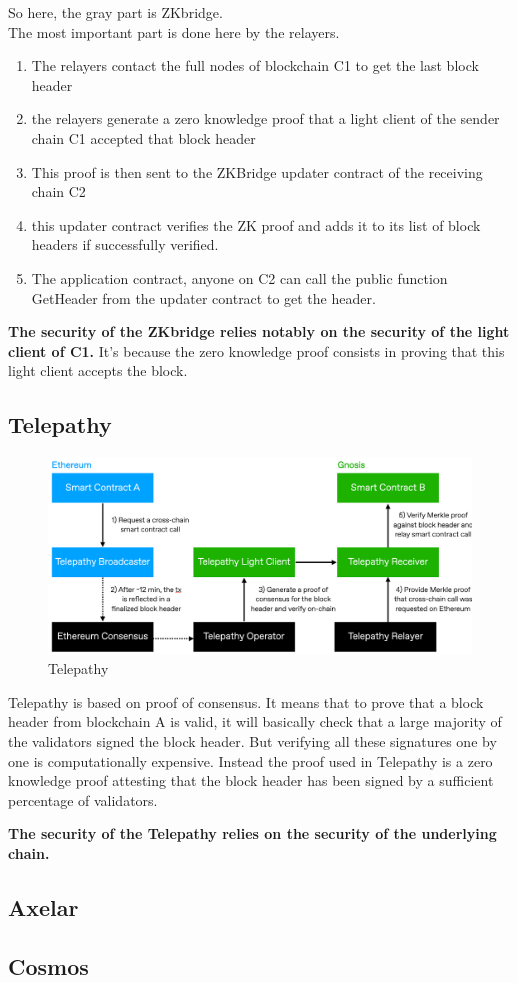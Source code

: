 So here, the gray part is ZKbridge.
\\The most important part is done here by the relayers. 
\begin{enumerate}
    \item The relayers contact the full nodes of blockchain C1 to get the last block header%
    \item the relayers generate a zero knowledge proof that a light client of the sender chain C1 accepted that block header
    \item This proof is then sent to the ZKBridge updater contract of the receiving chain C2
    \item this updater contract verifies the ZK proof and adds it to its list of block headers if successfully verified.
    \item The application contract, anyone on C2 can call the public function GetHeader from the updater contract to get the header. 
\end{enumerate}

\textbf{The security of the ZKbridge relies notably on the security of the light client of C1.} It's because the zero knowledge proof consists in proving that this light client accepts the block.
\subsection{Telepathy}

\begin{figure}[H]
    \centering
    \includegraphics[width=0.8\linewidth]{interoperability/telepathy.png}
    \caption{Telepathy}
    \label{fig:telepathy}
\end{figure}

Telepathy is based on proof of consensus. It means that to prove that a block header from blockchain A is valid, it will basically check that a large majority of the validators signed the block header. But verifying all these signatures one by one is computationally expensive. Instead the proof used in Telepathy is a zero knowledge proof attesting that the block header has been signed by a sufficient percentage of validators. 

\textbf{The security of the Telepathy relies on the security of the underlying chain.}
\subsection{Axelar}

\subsection{Cosmos}